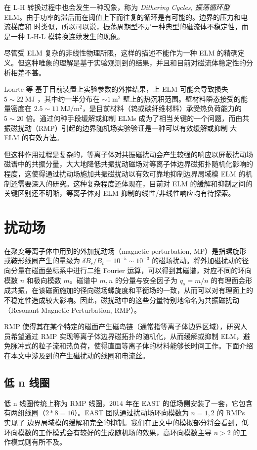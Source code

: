 在 L-H 转换过程中也会发生一种现象，称为 \textit{Dithering Cycles, 振荡循环型} ELM。由于\Hmode 功率的滞后而在阈值上下而往复的循环是有可能的。边界的压力和电流梯度和 \Lmode 时类似，所以可以说，振荡周期型不是一种典型的磁流体不稳定性，而是一种 L-H-L 模转换连续发生的现象。

尽管受 ELM 复杂的非线性物理所限，这样的描述不能作为一种 ELM 的精确定义。但这种唯象的理解是基于实验观测到的结果，并且和目前对磁流体稳定性的分析相差不甚。



Loarte 等\cite{2003PPCF...45.1549L} 基于目前装置上实验参数的外推结果，\iter 上 \typeone ELM 可能会导致损失 $5\sim \SI{22}{\mega\joule}$ ，其中约一半分布在 $\sim \SI{1}{\meter^2}$ 壁上的热沉积范围。壁材料瞬态接受的能量密度在 $2.5\sim \SI{11}{\mega\joule/\meter^2}$，是目前材料（钨或碳纤维材料）承受热负荷能力的 $5\sim 20$ 倍。通过何种手段缓解或抑制 ELMs 成为了相当关键的一个问题，而由共振磁扰动（RMP）引起的边界随机场实验验证是一种可以有效缓解或抑制 \typeone 大 ELM 的有效方法。


但这种作用过程是复杂的，等离子体对共振磁扰动会产生较强的响应以屏蔽扰动场磁谱中的共振分量，大大地降低共振扰动磁场对等离子体边界磁拓扑随机化影响的程度，这使得通过扰动场施加共振磁扰动以有效可靠地抑制边界局域模 ELM 的机制还需要深入的研究。这种复杂程度还体现在，目前对 ELM 的缓解和抑制之间的关键区别还不明晰，等离子体对 ELM 抑制的线性/非线性响应均有待探索。

\section{扰动场}

在聚变等离子体中用到的外加扰动场（magnetic perturbation, MP）是指螺旋形或鞍形线圈产生的量级为 $\delta B_r/B_t=10^{-5}\sim 10^{-3}$ 的磁场扰动。将外加磁扰动的径向分量在磁面坐标系中进行二维 Fourier 运算，可以得到其磁谱，对应不同的环向模数 $n$ 和极向模数 $m$。磁谱中 $m,n$ 的分量与安全因子为 $q_s=m/n$ 的有理面会形成共振，在该磁面施加的径向磁场螺旋度和平衡场的一致，从而可以对有理面上的不稳定性造成较大影响。因此，磁扰动中的这些分量特别地命名为共振磁扰动（Resonant Magnetic Perturbation, RMP）。


RMP 使得其在某个特定的磁面产生磁岛链（通常指等离子体边界区域），研究人员希望通过 RMP 实现等离子体边界磁拓扑的随机化，从而缓解或抑制 ELM，避免脉冲式的粒子流和热负荷，使得直面等离子体的材料能够长时间工作。下面介绍在本文中涉及到的产生磁扰动的线圈和电流丝。


\subsection{低 n 线圈}
低 n 线圈传统上称为 RMP 线圈，2014 年在 EAST 的低场侧安装了一套，它包含有两组线圈（$2*8=16$）。EAST 团队通过扰动场环向模数为 $n=1, 2$ 的 RMPs 实现了 \typeone 边界局域模的缓解和完全的抑制。我们在正文中的模拟部分将会看到，低环向模数的工作模式会有较好的生成随机场的效果，高环向模数主导 $n>2$ 的工作模式则有所不及。

